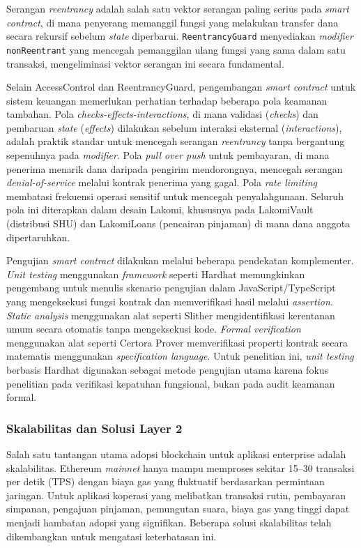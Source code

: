 Serangan \textit{reentrancy} adalah salah satu vektor serangan paling serius pada \textit{smart contract}, di mana penyerang memanggil fungsi yang melakukan transfer dana secara rekursif sebelum \textit{state} diperbarui. \texttt{ReentrancyGuard} menyediakan \textit{modifier} \texttt{nonReentrant} yang mencegah pemanggilan ulang fungsi yang sama dalam satu transaksi, mengeliminasi vektor serangan ini secara fundamental.

Selain AccessControl dan ReentrancyGuard, pengembangan \textit{smart contract} untuk sistem keuangan memerlukan perhatian terhadap beberapa pola keamanan tambahan. Pola \textit{checks-effects-interactions}, di mana validasi (\textit{checks}) dan pembaruan \textit{state} (\textit{effects}) dilakukan sebelum interaksi eksternal (\textit{interactions}), adalah praktik standar untuk mencegah serangan \textit{reentrancy} tanpa bergantung sepenuhnya pada \textit{modifier}. Pola \textit{pull over push} untuk pembayaran, di mana penerima menarik dana daripada pengirim mendorongnya, mencegah serangan \textit{denial-of-service} melalui kontrak penerima yang gagal. Pola \textit{rate limiting} membatasi frekuensi operasi sensitif untuk mencegah penyalahgunaan. Seluruh pola ini diterapkan dalam desain Lakomi, khususnya pada LakomiVault (distribusi SHU) dan LakomiLoans (pencairan pinjaman) di mana dana anggota dipertaruhkan.

Pengujian \textit{smart contract} dilakukan melalui beberapa pendekatan komplementer. \textit{Unit testing} menggunakan \textit{framework} seperti Hardhat \cite{hardhat} memungkinkan pengembang untuk menulis skenario pengujian dalam JavaScript/TypeScript yang mengeksekusi fungsi kontrak dan memverifikasi hasil melalui \textit{assertion}. \textit{Static analysis} menggunakan alat seperti Slither mengidentifikasi kerentanan umum secara otomatis tanpa mengeksekusi kode. \textit{Formal verification} menggunakan alat seperti Certora Prover memverifikasi properti kontrak secara matematis menggunakan \textit{specification language}. Untuk penelitian ini, \textit{unit testing} berbasis Hardhat digunakan sebagai metode pengujian utama karena fokus penelitian pada verifikasi kepatuhan fungsional, bukan pada audit keamanan formal.

\subsubsection{Skalabilitas dan Solusi Layer 2}

Salah satu tantangan utama adopsi blockchain untuk aplikasi enterprise adalah skalabilitas. Ethereum \textit{mainnet} hanya mampu memproses sekitar 15--30 transaksi per detik (TPS) dengan biaya gas yang fluktuatif berdasarkan permintaan jaringan. Untuk aplikasi koperasi yang melibatkan transaksi rutin, pembayaran simpanan, pengajuan pinjaman, pemungutan suara, biaya gas yang tinggi dapat menjadi hambatan adopsi yang signifikan. Beberapa solusi skalabilitas telah dikembangkan untuk mengatasi keterbatasan ini.

